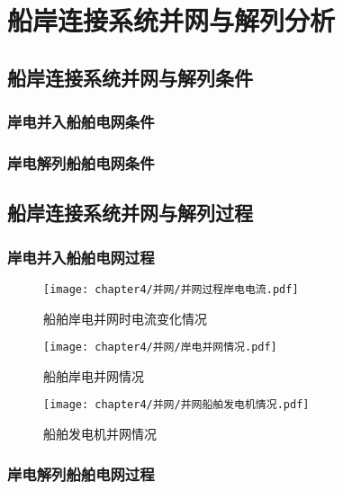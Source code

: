 \chapter{船岸连接系统并网与解列分析}

\section{船岸连接系统并网与解列条件}

\subsection{岸电并入船舶电网条件}

\subsection{岸电解列船舶电网条件}

\section{船岸连接系统并网与解列过程}

\subsection{岸电并入船舶电网过程}

\begin{figure}[!htp]
	\centering
	\texttt{[image: chapter4/并网/并网过程岸电电流.pdf]}
	\caption{船舶岸电并网时电流变化情况}
	\label{fig:船舶岸电并网时电流变化情况}
\end{figure}

\begin{figure}[!htp]
	\centering
	\texttt{[image: chapter4/并网/岸电并网情况.pdf]}
	\caption{船舶岸电并网情况}
	\label{fig:船舶岸电并网情况}
\end{figure}

\begin{figure}[!htp]
	\centering
	\texttt{[image: chapter4/并网/并网船舶发电机情况.pdf]}
	\caption{船舶发电机并网情况}
	\label{fig:船舶发电机并网情况}
\end{figure}


\subsection{岸电解列船舶电网过程}



